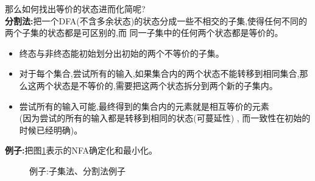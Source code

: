 \documentclass[UTF8,a4paper]{ctexart}
\newcommand{\spaceline}{\vspace{\baselineskip}}
\begin{document}
  \spaceline
  那么如何找出等价的状态进而化简呢?\\
  \textbf{分割法:}把一个DFA(不含多余状态)的状态分成一些不相交的子集,使得任何不同的两个子集的状态都是可区别的,而
  同一子集中的任何两个状态都是等价的。

  \begin{itemize}
    \item 终态与非终态能初始划分出初始的两个不等价的子集。
    \item 对于每个集合,尝试所有的输入,如果集合内的两个状态不能转移到相同集合,那么这两个状态是不等价的,需要把这两个状态拆分到两个新的子集内。
    \item 尝试所有的输入可能,最终得到的集合内的元素就是相互等价的元素\\
    (因为尝试的所有的输入都是转移到相同的状态(可蔓延性) , 而一致性在初始的时候已经明确)。
  \end{itemize}

  \spaceline
  \textbf{例子:}把图\ref{example-zijifafengefa}表示的NFA确定化和最小化。
  \begin{figure}[H]
    \centering
    \caption{例子:子集法、分割法例子}
    \label{example-zijifafengefa}
  \end{figure}
\end{document}
